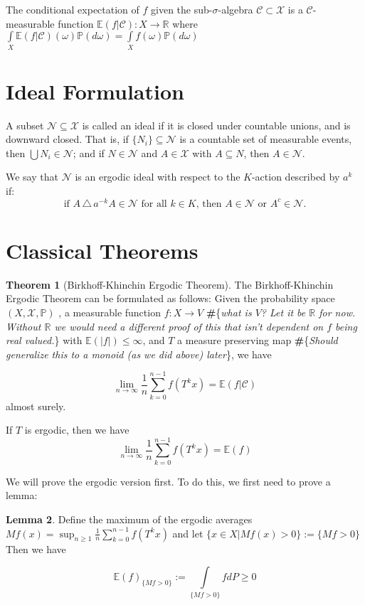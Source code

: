 \documentclass[letterpaper,10pt,oneside,onecolumn,reqno]{amsart}
\newcommand{\C}{\mathcal C}
\newcommand{\E}{\mathbb E}
\newcommand{\N}{\mathcal N}
\renewcommand{\P}{\mathbb P}
\newcommand{\R}{\mathbb R}
\newcommand{\X}{\mathcal X}
\newcommand{\sup}{\operatorname{sup}}
\theoremstyle{definition}
\newtheorem{thm}{Theorem}
\newtheorem{lem}[thm]{Lemma}
\newcommand{\jake}[1]{{\textbf{\color{Purple}\#}{\color{Purple}\{\emph{#1}\}}}}
\begin{document}
The conditional expectation of $f$ given the sub-$\sigma$-algebra $\C \subset \X$ is a $\C$-measurable function $\E(f|\C): X \to \R$ where $\int\limits_{X}\E(f|\C)(\omega)\P(d\omega)=\int\limits_{X}f(\omega)\P(d\omega)$ 

	\section{Ideal Formulation}

	A subset $\N \subseteq \X$ is called an ideal if it is closed under countable unions, and is downward closed. That is, if $\{ N_i \} \subseteq \N$ is a countable set of measurable events, then $\bigcup N_i \in \N$; and if $N \in \N$ and $A \in \X$ with $A \subseteq N$, then $A \in \N$.

	We say that $\N$ is an ergodic ideal with respect to the $K$-action described by $a^k$ if:
		$$\mbox{if $A \,\triangle\, a^{-k} A \in \N$ for all $k \in K$, then $A \in \N$ or $A^c \in \N$.}$$

\section{Classical Theorems}
	
		\begin{thm}[Birkhoff-Khinchin Ergodic Theorem]
			The Birkhoff-Khinchin Ergodic Theorem can be formulated as follows: Given the probability space $(X,\X, \P)$ , a measurable function $f : X \to V$ \jake{what is $V$? Let it be $\R$ for now. Without $\R$ we would need a different proof of this that isn't dependent on $f$ being real valued.} with $\E(|f|) \leq \infty$, and $T$ a measure preserving map \jake{Should generalize this to a monoid (as we did above) later}, we have  

$$\mbox{$\lim_{n \to \infty}\frac{1}{n}\sum\limits_{k=0}^{n-1} f(T^kx) = \E(f | \C)$}$$ 
almost surely. 

If $T$ is ergodic, then we have
$$\mbox{$\lim_{n \to \infty}\frac{1}{n}\sum\limits_{k=0}^{n-1} f(T^kx) = \E(f)$}$$
		\end{thm}
We will prove the ergodic version first. To do this, we first need to prove a lemma:

\begin{lem}
Define the maximum of the ergodic averages $Mf(x) = \sup_{n \geq 1} \frac{1}{n}\sum\limits_{k=0}^{n-1} f(T^k x)$ and let $\{x \in X | Mf(x) > 0\} := {\{Mf>0\}}$ Then we have

$$\mbox{$\E(f)_{\{Mf>0\}} := \int\limits_{\{Mf>0\}} fdP \geq 0$}$$
\end{lem}
\end{document}
